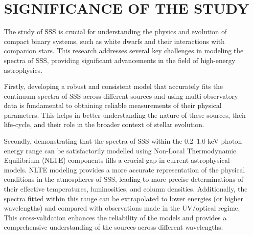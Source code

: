     
    \section{\MakeUppercase{Significance of the Study}} \label{introduction:significance}
    	The study of SSS is crucial for understanding the physics and evolution of compact binary systems, such as white dwarfs and their interactions with companion stars. This research addresses several key challenges in modeling the spectra of SSS, providing significant advancements in the field of high-energy astrophysics.
    	
    	Firstly, developing a robust and consistent model that accurately fits the continuum spectra of SSS across different sources and using multi-observatory data is fundamental to obtaining reliable measurements of their physical parameters. This helps in better understanding the nature of these sources, their life-cycle, and their role in the broader context of stellar evolution.
    	
    	Secondly, demonstrating that the spectra of SSS within the 0.2--1.0 keV photon energy range can be satisfactorily modelled using Non-Local Thermodynamic Equilibrium (NLTE) components fills a crucial gap in current astrophysical models. NLTE modeling provides a more accurate representation of the physical conditions in the atmospheres of SSS, leading to more precise determinations of their effective temperatures, luminosities, and column densities. Additionally, the spectra fitted within this range can be extrapolated to lower energies (or higher wavelengths) and compared with observations made in the UV/optical regime. This cross-validation enhances the reliability of the models and provides a comprehensive understanding of the sources across different wavelengths.
    	
